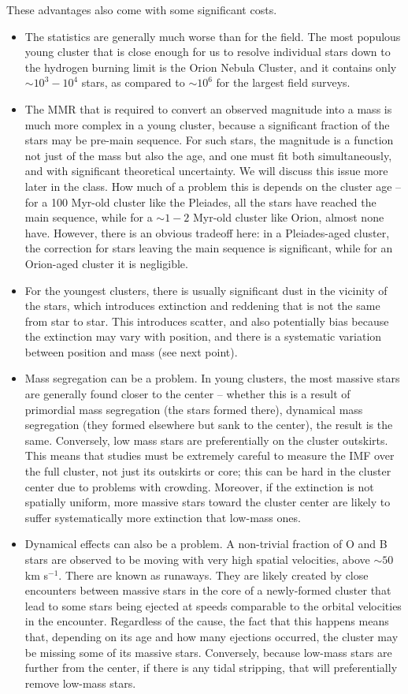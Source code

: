 These advantages also come with some significant costs.
\begin{itemize}
\item The statistics are generally much worse than for the field. The most populous young cluster that is close enough for us to resolve individual stars down to the hydrogen burning limit is the Orion Nebula Cluster, and it contains only $\sim 10^3 - 10^4$ stars, as compared to $\sim 10^6$ for the largest field surveys.
\item The MMR that is required to convert an observed magnitude into a mass is much more complex in a young cluster, because a significant fraction of the stars may be pre-main sequence. For such stars, the magnitude is a function not just of the mass but also the age, and one must fit both simultaneously, and with significant theoretical uncertainty. We will discuss this issue more later in the class. How much of a problem this is depends on the cluster age -- for a 100 Myr-old cluster like the Pleiades, all the stars have reached the main sequence, while for a $\sim 1-2$ Myr-old cluster like Orion, almost none have. However, there is an obvious tradeoff here: in a Pleiades-aged cluster, the correction for stars leaving the main sequence is significant, while for an Orion-aged cluster it is negligible.
\item For the youngest clusters, there is usually significant dust in the vicinity of the stars, which introduces extinction and reddening that is not the same from star to star. This introduces scatter, and also potentially bias because the extinction may vary with position, and there is a systematic variation between position and mass (see next point).
\item Mass segregation can be a problem. In young clusters, the most massive stars are generally found closer to the center -- whether this is a result of primordial mass segregation (the stars formed there), dynamical mass segregation (they formed elsewhere but sank to the center), the result is the same. Conversely, low mass stars are preferentially on the cluster outskirts. This means that studies must be extremely careful to measure the IMF over the full cluster, not just its outskirts or core; this can be hard in the cluster center due to problems with crowding. Moreover, if the extinction is not spatially uniform, more massive stars toward the cluster center are likely to suffer systematically more extinction that low-mass ones.
\item Dynamical effects can also be a problem. A non-trivial fraction of O and B stars are observed to be moving with very high spatial velocities, above $\sim 50$ km s$^{-1}$. There are known as runaways. They are likely created by close encounters between massive stars in the core of a newly-formed cluster that lead to some stars being ejected at speeds comparable to the orbital velocities in the encounter. Regardless of the cause, the fact that this happens means that, depending on its age and how many ejections occurred, the cluster may be missing some of its massive stars. Conversely, because low-mass stars are further from the center, if there is any tidal stripping, that will preferentially remove low-mass stars.

\end{itemize}
